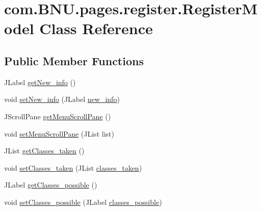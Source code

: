 \hypertarget{classcom_1_1_b_n_u_1_1pages_1_1register_1_1_register_model}{}\section{com.\+B\+N\+U.\+pages.\+register.\+Register\+Model Class Reference}
\label{classcom_1_1_b_n_u_1_1pages_1_1register_1_1_register_model}
\subsection*{Public Member Functions}
\begin{DoxyCompactItemize}
\item 
J\+Label \mbox{\hyperlink{classcom_1_1_b_n_u_1_1pages_1_1register_1_1_register_model_afb44e5b855ea7790e96db27aa90c17af}{get\+New\+\_\+info}} ()
\item 
void \mbox{\hyperlink{classcom_1_1_b_n_u_1_1pages_1_1register_1_1_register_model_a6a43b8de20d0f62a0b0eaa2895b0ddf6}{set\+New\+\_\+info}} (J\+Label \mbox{\hyperlink{classcom_1_1_b_n_u_1_1pages_1_1register_1_1_register_model_a50fe7b0287bf29bbdd0f304595859ee5}{new\+\_\+info}})
\item 
J\+Scroll\+Pane \mbox{\hyperlink{classcom_1_1_b_n_u_1_1pages_1_1register_1_1_register_model_a9654a17971e42e49052bc017a085fb6e}{get\+Menu\+Scroll\+Pane}} ()
\item 
void \mbox{\hyperlink{classcom_1_1_b_n_u_1_1pages_1_1register_1_1_register_model_a3d73c7162689088d97813fa342ea32d1}{set\+Menu\+Scroll\+Pane}} (J\+List list)
\item 
J\+List \mbox{\hyperlink{classcom_1_1_b_n_u_1_1pages_1_1register_1_1_register_model_afbfeede942e7139c46a35a575dbea212}{get\+Classes\+\_\+taken}} ()
\item 
void \mbox{\hyperlink{classcom_1_1_b_n_u_1_1pages_1_1register_1_1_register_model_a9b8346df9bdaf4e9a70df04e5fd5f8b7}{set\+Classes\+\_\+taken}} (J\+List \mbox{\hyperlink{classcom_1_1_b_n_u_1_1pages_1_1register_1_1_register_model_a6da9d405026c705b1ed50f0c48c50640}{classes\+\_\+taken}})
\item 
J\+Label \mbox{\hyperlink{classcom_1_1_b_n_u_1_1pages_1_1register_1_1_register_model_a190f95addab5f8333578210da4e58286}{get\+Classes\+\_\+possible}} ()
\item 
void \mbox{\hyperlink{classcom_1_1_b_n_u_1_1pages_1_1register_1_1_register_model_a955803d88daf3d2d95936dc89b91cbee}{set\+Classes\+\_\+possible}} (J\+Label \mbox{\hyperlink{classcom_1_1_b_n_u_1_1pages_1_1register_1_1_register_model_a3014839846b360c2e4f8416fd389c199}{classes\+\_\+possible}})

\end{DoxyCompactItemize}
